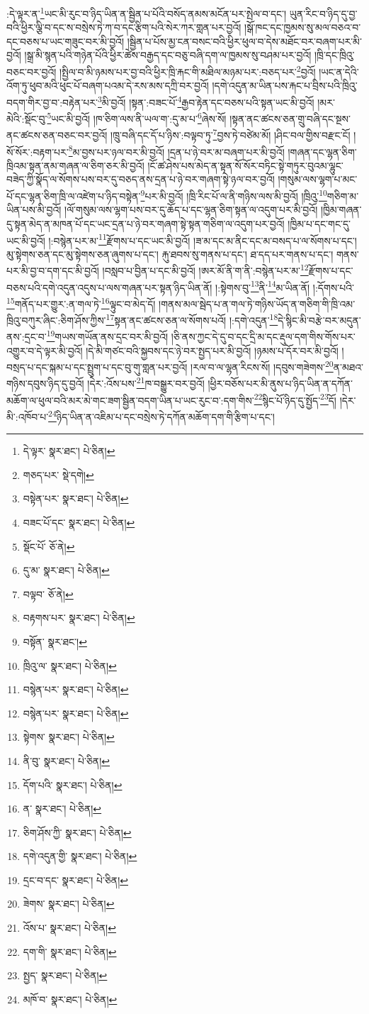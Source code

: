 :དེ་ལྟར་ན་\footnote{དེ་ལྟར་  སྣར་ཐང་།  པེ་ཅིན། }ཡང་མི་རུང་བ་ཉིད་ཡིན་ན་སྦྱིན་པ་པོའི་བསོད་ནམས་མངོན་པར་སྤེལ་བ་དང་། ཡུན་རིང་བ་ཉིད་དུ་བྱ་བའི་ཕྱིར་ལྕི་བ་དང་ས་བསྲེས་ཏེ་ཀ་བ་དང་རྩིག་པའི་སེར་ཀར་གླན་པར་བྱའོ། །སྒོ་ཁང་དང་ཁྱམས་སུ་མལ་བཅའ་བ་དང་བཅས་པ་ཡང་གཟུང་བར་མི་བྱའོ། །སྦྱིན་པ་པོས་མྱ་ངན་བསང་བའི་ཕྱིར་ཕུལ་བ་དེས་མཐོང་བར་བཞག་པར་མི་བྱའོ། །སྒྲ་མི་སྙན་པའི་གཉེན་པོའི་ཕྱིར་ཚེས་བརྒྱད་དང་བཅུ་བཞི་དག་ལ་ཁྱམས་སུ་བཤམ་པར་བྱའོ། །ཁྲི་དང་ཁྲིའུ་བཅང་བར་བྱའོ། །སྤྱིལ་བ་མི་ཉམས་པར་བྱ་བའི་ཕྱིར་ཁྲི་རྐང་གི་མཐིལ་མཉམ་པར་:བཅད་པར་\footnote{གཅད་པར་  སྡེ་དགེ། }བྱའོ། །ཡང་ན་དེའི་འོག་ཏུ་ཕུབ་མའི་ཕུང་པོ་བཞག་པའམ་དེ་རས་མས་དཀྲི་བར་བྱའོ། །དགེ་འདུན་མ་ཡིན་པས་རྐང་པ་བྲིས་པའི་ཁྲིའུ་བདག་གིར་བྱ་བ་:བརྟེན་པར་\footnote{བསྟེན་པར་  སྣར་ཐང་།  པེ་ཅིན། }མི་བྱའོ། །སྟན་:བཟང་པོ་\footnote{བཟང་པོ་དང་  སྣར་ཐང་།  པེ་ཅིན། }རྒྱབ་རྟེན་དང་བཅས་པའི་སྟན་ཡང་མི་བྱའོ། །མར་མེའི་:སྡོང་བུ་\footnote{སྡོང་པོ་  ཅོ་ནེ། }ཡང་མི་བྱའོ། །ཁ་ཅིག་ལས་ནི་ཡལ་ག་:དུ་མ་པ་\footnote{དུ་མ་  སྣར་ཐང་།  པེ་ཅིན། }ཞེས་སོ། །སྟན་ནང་ཚངས་ཅན་གྲུ་བཞི་དང་སྔས་ནང་ཚངས་ཅན་བཅང་བར་བྱའོ། །ཁྲུ་བཞི་དང་དོ་པ་ཉིས་:བལྟབ་ཏུ་\footnote{བལྟབ་  ཅོ་ནེ། }བྱས་ཏེ་བཙེམ་མོ། །ཤིང་བལ་གྱིས་བརྫང་ངོ། །སོ་སོར་:བརྟག་པར་\footnote{བརྟགས་པར་  སྣར་ཐང་།  པེ་ཅིན། }མ་བྱས་པར་ཉལ་བར་མི་བྱའོ། །དྲན་པ་ཉེ་བར་མ་བཞག་པར་མི་བྱའོ། །གཞན་དང་ལྷན་ཅིག་ཁྲིའམ་སྟན་ནམ་གཞན་ལ་ཅིག་ཅར་མི་བྱའོ། །ངོ་ཚ་ཤེས་པས་མེད་ན་སྟན་སོ་སོར་བཏིང་སྟེ་གཏུར་བུའམ་ལྷུང་བཟེད་ཀྱི་སྣོད་ལ་སོགས་པས་བར་དུ་བཅད་ནས་དྲན་པ་ཉེ་བར་གཞག་སྟེ་ཉལ་བར་བྱའོ། །གསུམ་ལས་ལྷག་པ་མང་པོ་དང་ལྷན་ཅིག་ཁྲི་ལ་འཛེག་པ་ཉིད་བསྟེན་\footnote{བསྟོན་  སྣར་ཐང་། }པར་མི་བྱའོ། །ཁྲི་རིང་པོ་ལ་ནི་གཉིས་ལས་མི་བྱའོ། །ཁྲིའུ་\footnote{ཁྲིའུ་ལ་  སྣར་ཐང་།  པེ་ཅིན། }གཅིག་མ་ཡིན་པས་མི་བྱའོ། །ལོ་གསུམ་ལས་ལྷག་པས་བར་དུ་ཆོད་པ་དང་ལྷན་ཅིག་སྟན་ལ་འདུག་པར་མི་བྱའོ། །ཁྱིམ་གཞན་དུ་སྟན་མེད་ན་མཁན་པོ་དང་ཡང་དྲན་པ་ཉེ་བར་གཞག་སྟེ་སྟན་གཅིག་ལ་འདུག་པར་བྱའོ། །ཁྱིམ་པ་དང་གང་དུ་ཡང་མི་བྱའོ། །:བསྙེན་པར་མ་\footnote{བསྙེན་པར་  སྣར་ཐང་།  པེ་ཅིན། }རྫོགས་པ་དང་ཡང་མི་བྱའོ། །ཟ་མ་དང་མ་ནིང་དང་མ་བསད་པ་ལ་སོགས་པ་དང་། མུ་སྟེགས་ཅན་དང་མུ་སྟེགས་ཅན་ཞུགས་པ་དང་། རྐུ་ཐབས་སུ་གནས་པ་དང་། ཐ་དད་པར་གནས་པ་དང་། གནས་པར་མི་བྱ་བ་དག་དང་མི་བྱའོ། །བསླབ་པ་བྱིན་པ་དང་མི་བྱའོ། །ཨར་མོ་ནི་ག་ནི་:བསྙེན་པར་མ་\footnote{བསྙེན་པར་  སྣར་ཐང་།  པེ་ཅིན། }རྫོགས་པ་དང་བཅས་པའི་དགེ་འདུན་འདུས་པ་ལས་གཞན་པར་སྟན་ཉིད་ཡིན་ནོ། །:སྟེགས་བུ་\footnote{སྟེགས་  སྣར་ཐང་།  པེ་ཅིན། }ནི་\footnote{ནི་བུ་  སྣར་ཐང་།  པེ་ཅིན། }མ་ཡིན་ནོ། །:དོགས་པའི་\footnote{དོག་པའི་  སྣར་ཐང་།  པེ་ཅིན། }གནོད་པར་གྱུར་:ན་གལ་ཏེ་\footnote{ན་  སྣར་ཐང་།  པེ་ཅིན། }ལྟུང་བ་མེད་དོ། །གནས་མལ་སྦེད་པ་ན་གལ་ཏེ་གཉིས་ཡོད་ན་གཅིག་གི་ཁྲི་འམ་ཁྲིའུ་བཀུར་ཞིང་:ཅིག་ཤོས་ཀྱིས་\footnote{ཅིག་ཤོས་ཀྱི་  སྣར་ཐང་།  པེ་ཅིན། }སྟན་ནང་ཚངས་ཅན་ལ་སོགས་པའོ། །:དགེ་འདུན་\footnote{དགེ་འདུན་གྱི་  སྣར་ཐང་།  པེ་ཅིན། }དེ་སྙིང་མི་བརྩེ་བར་མདུན་ནས་:དྲང་བ་\footnote{དྲང་བ་དང་  སྣར་ཐང་།  པེ་ཅིན། }གཡས་གཡོན་ནས་དྲང་བར་མི་བྱའོ། །ཅི་ནས་ཀྱང་དེ་དུ་བ་དང་དྲི་མ་དང་རྡུལ་དག་གིས་གོས་པར་འགྱུར་བ་དེ་ལྟར་མི་བྱའོ། །དེ་མི་གཙང་བའི་སྐྱབས་དང་ཉེ་བར་སྤྱད་པར་མི་བྱའོ། །ཉམས་པ་དོར་བར་མི་བྱའོ། །བསྲད་པ་དང་སྐམ་པ་དང་སྤྲུག་པ་དང་བུ་གུ་གླན་པར་བྱའོ། །རལ་བ་ལ་ལྷན་རིངས་སོ། །དབུས་གཟེགས་\footnote{ཟེགས་  སྣར་ཐང་།  པེ་ཅིན། }ན་མཐའ་གཉིས་དབུས་ཉིད་དུ་བྱའོ། །དེར་:འོས་པས་\footnote{འོས་པ་  སྣར་ཐང་།  པེ་ཅིན། }ཁ་བསྒྱུར་བར་བྱའོ། །ཕྱིར་བཅོས་པར་མི་ནུས་པ་ཉིད་ཡིན་ན་དཀོན་མཆོག་ལ་ཕུལ་བའི་མར་མེ་གང་ཟག་སྦྱིན་བདག་ཡིན་པ་ཡང་རུང་བ་:དག་གིས་\footnote{དག་གི་  སྣར་ཐང་།  པེ་ཅིན། }སྙིང་པོ་ཉིད་དུ་སྤྱོད་\footnote{སྤྱད་  སྣར་ཐང་།  པེ་ཅིན། }དོ། །དེར་མི་:འཁོབ་པ་\footnote{མཁོ་བ་  སྣར་ཐང་།  པེ་ཅིན། }ཉིད་ཡིན་ན་འཇིམ་པ་དང་བསྲེས་ཏེ་དཀོན་མཆོག་དག་གི་རྩིག་པ་དང་། 
